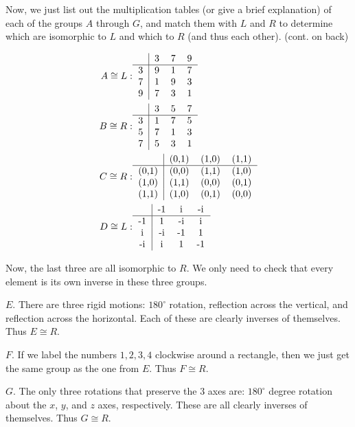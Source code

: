 Now, we just list out the multiplication tables (or give a brief explanation) of each of the groups $A$ through $G$, and match them with $L$ and $R$ to determine which are isomorphic to $L$ and which to $R$ (and thus each other). (cont. on back)

\begin{align*}
    A \cong L: & \begin{tabular}{c|ccc}
    & 3 & 7 & 9 \\
\hline
3 & 9 & 1 & 7 \\
7 & 1 & 9 & 3 \\
9 & 7 & 3 & 1
\end{tabular} \\
B \cong R: & \begin{tabular}{c|ccc}
    & 3 & 5 & 7 \\
\hline
3 & 1 & 7 & 5 \\
5 & 7 & 1 & 3 \\
7 & 5 & 3 & 1
\end{tabular} \\
C \cong R: & \begin{tabular}{c|ccc}
    & (0,1) & (1,0) & (1,1) \\
\hline
(0,1) & (0,0) & (1,1) & (1,0) \\
(1,0) & (1,1) & (0,0) & (0,1) \\
(1,1) & (1,0) & (0,1) & (0,0)
\end{tabular} \\
D \cong L: & \begin{tabular}{c|ccc}
    & -1 & i & -i \\
\hline
-1 & 1 & -i & i \\
i & -i & -1 & 1 \\
-i & i & 1 & -1
\end{tabular}
\end{align*}

Now, the last three are all isomorphic to $R$. We only need to check that every element is its own inverse in these three groups. 

$E$. There are three rigid motions: $180^\circ$ rotation, reflection across the vertical, and reflection across the horizontal. Each of these are clearly inverses of themselves. Thus $E \cong R$.

$F$. If we label the numbers $1, 2, 3, 4$ clockwise around a rectangle, then we just get the same group as the one from $E$. Thus $F \cong R$.

$G$. The only three rotations that preserve the 3 axes are: $180^\circ$ degree rotation about the $x$, $y$, and $z$ axes, respectively. These are all clearly inverses of themselves. Thus $G \cong R$.

